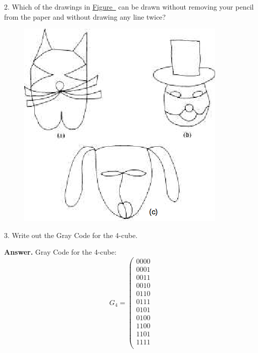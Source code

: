\documentclass[10pt,]{book}
\theoremstyle{plain}
\theoremstyle{definition}
\theoremstyle{definition}
\theoremstyle{definition}
\theoremstyle{definition}
\theoremstyle{definition}
\numberwithin{equation}{section}
\begin{document}
\begin{exercisegroup}
%
\item[2.]\hypertarget{exercise-22}{} Which of the drawings in \hyperref[fig-drawings-9-4]{Figure~} can be drawn without removing your pencil from the paper and without drawing any line twice?%
\leavevmode%
\begin{figure}
\centering
\includegraphics[width=1\linewidth]{images/fig-drawings-9-4.png}
\end{figure}
\par\smallskip
\item[3.]\hypertarget{exercise-23}{}Write out the Gray Code for the 4-cube.%
\par\smallskip
\par\smallskip
\noindent\textbf{Answer.}\hypertarget{answer-7}{}\quad
 Gray Code for the 4-cube:
\[G_4=\left(
\begin{array}{c}
 0000 \\
 0001 \\
 0011 \\
 0010 \\
 0110 \\
 0111 \\
 0101 \\
 0100 \\
 1100 \\
 1101 \\
 1111 \\

\end{array}\]
\end{exercisegroup}
\end{document}
